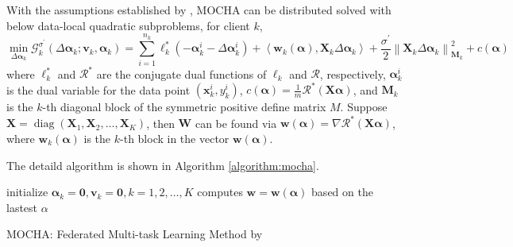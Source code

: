 \documentclass[a4paper,12pt,authoryear]{elegantpaper}
\begin{document}
With the assumptions established by \cite{smith_federated_2017}, MOCHA can be distributed solved with below data-local quadratic subproblems, for client $k$,
\begin{equation}
    \min_{\Delta\mathbf{\alpha}_{k}}\mathcal{G}_{k}^{\sigma^{\prime}}\left(\Delta\mathbf{\alpha}_{k};\mathbf{v}_{k},\mathbf{\alpha}_{k}\right)=\sum_{i=1}^{n_{k}}\ell_{k}^{*}\left(-\mathbf{\alpha}_{k}^{i}-\Delta\mathbf{\alpha}_{k}^{i}\right)+\left\langle\mathbf{w}_{k}(\mathbf{\alpha}),\mathbf{X}_{k}\Delta\mathbf{\alpha}_{k}\right\rangle+\frac{\sigma^{\prime}}{2}\left\|\mathbf{X}_{k}\Delta\mathbf{\alpha}_{k}\right\|_{\mathbf{M}_{k}}^{2}+c(\mathbf{\alpha})
\end{equation}
where $\ell_{k}^{*}$ and $\mathcal{R}^{*}$ are the conjugate dual functions of $\ell_{k}$ and $\mathcal{R}$, respectively, $\mathbf{\alpha}_{k}^{i}$ is the dual variable for the data point $\left(\mathbf{x}_{k}^{i},y_{k}^{i}\right)$, $c(\mathbf{\alpha})=\frac{1}{m}\mathcal{R}^{*}(\mathbf{X}\mathbf{\alpha})$, and $\mathbf{M}_{k}$ is the $k$-th diagonal block of the symmetric positive define matrix $M$. Suppose $\mathbf{X}=\operatorname{diag}\left(\mathbf{X}_{1},\mathbf{X}_{2},\ldots,\mathbf{X}_{K}\right)$, then $\mathbf{W}$ can be found via $\mathbf{w}(\mathbf{\alpha})=\nabla\mathcal{R}^{*}(\mathbf{X}\mathbf{\alpha})$, where $\mathbf{w}_{k}(\mathbf{\alpha})$ is the $k$-th block in the vector $\mathbf{w}(\mathbf{\alpha})$.

The detaild algorithm is shown in Algorithm \ref{algorithm:mocha}.

\begin{algorithm}
    initialize $\mathbf{\alpha}_{k}=\mathbf{0},\mathbf{v}_{k}=\mathbf{0},k=1,2,\ldots,K$\;
    computes $\mathbf{w}=\mathbf{w}(\mathbf{\alpha})$ based on the lastest $\alpha$\;
    \caption{MOCHA: Federated Multi-task Learning Method by \cite{smith_federated_2017}}\label{algorithm:mocha}
\end{algorithm}
\end{document}
